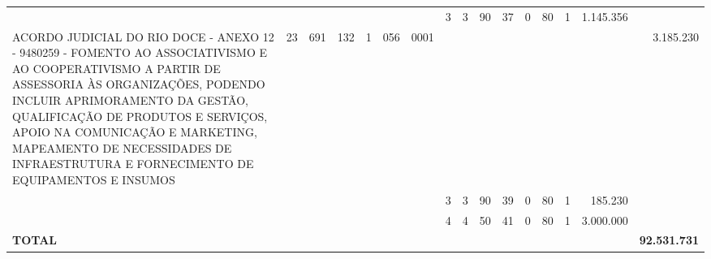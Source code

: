 \documentclass{article}
\begin{document}
\begin{longtable}[c]{m{6.5cm}|m{1pt}m{1pt}m{1pt}m{1pt}m{1pt}m{1pt}|m{1pt}m{1pt}m{0.5pt}m{1pt}|m{1pt}|m{1pt}m{1pt}|m{1pt}|m{2pt}}
& & & & & & & \multicolumn{1}{c}{ 3 } & \multicolumn{1}{c}{ 3 } & \multicolumn{1}{c}{ 90 } & \multicolumn{1}{c|}{ 37 } & \multicolumn{1}{c|}{ 0 } & \multicolumn{1}{l}{ 80 } & \multicolumn{1}{c|}{ 1 } & \multicolumn{1}{r|}{ 1.145.356 } & \\
\multicolumn{1}{L{5.5cm}|}{ ACORDO JUDICIAL DO RIO DOCE - ANEXO 12 - 9480259 - FOMENTO AO ASSOCIATIVISMO E AO COOPERATIVISMO A PARTIR DE ASSESSORIA ÀS ORGANIZAÇÕES, PODENDO INCLUIR APRIMORAMENTO DA GESTÃO, QUALIFICAÇÃO DE PRODUTOS E SERVIÇOS, APOIO NA COMUNICAÇÃO E MARKETING, MAPEAMENTO DE NECESSIDADES DE INFRAESTRUTURA E FORNECIMENTO DE EQUIPAMENTOS E INSUMOS } & \multicolumn{1}{c}{ 23 } & \multicolumn{1}{c}{ 691 } & \multicolumn{1}{c}{ 132 } & \multicolumn{1}{l}{ 1 } & \multicolumn{1}{c}{ 056 } & \multicolumn{1}{l|}{ 0001 } & & & & & & & & & \multicolumn{1}{r}{ 3.185.230 } \\
& & & & & & & \multicolumn{1}{c}{ 3 } & \multicolumn{1}{c}{ 3 } & \multicolumn{1}{c}{ 90 } & \multicolumn{1}{c|}{ 39 } & \multicolumn{1}{c|}{ 0 } & \multicolumn{1}{l}{ 80 } & \multicolumn{1}{c|}{ 1 } & \multicolumn{1}{r|}{ 185.230 } & \\
& & & & & & & \multicolumn{1}{c}{ 4 } & \multicolumn{1}{c}{ 4 } & \multicolumn{1}{c}{ 50 } & \multicolumn{1}{c|}{ 41 } & \multicolumn{1}{c|}{ 0 } & \multicolumn{1}{l}{ 80 } & \multicolumn{1}{c|}{ 1 } & \multicolumn{1}{r|}{ 3.000.000 } & \\
\hline
\multicolumn{15}{C{6cm}|}{\textbf{ TOTAL }} & \multicolumn{1}{r}{\textbf{ 92.531.731 }} \\
\end{longtable}
\newpage
{}
{}
\renewcommand*{\arraystretch}{1.9}
\scriptsize
\color{myblack}
\centering
\end{document}
